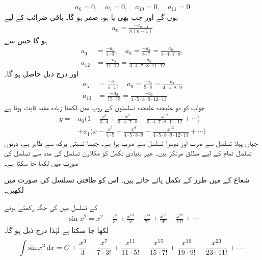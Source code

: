 \begin{align*}
a_6=0,\quad a_7=0,\quad a_{10}=0,\quad a_{11}=0
\end{align*}
ہوں گے اور جب بھی  یا  ہو،  صفر ہو گا۔ باقی ضرائب کے لیے 
\begin{align*}
a_n=\frac{-a_{n-4}}{n(n-1)}
\end{align*}
ہو گا جس سے
\begin{align*}
a_4&=\frac{-a_0}{4\cdot 3},\quad a_8=\frac{-a_4}{8\cdot 7}=\frac{a_0}{3\cdot 4\cdot 7\cdot 8},\\
a_{12}&=\frac{-a_8}{11\cdot 12}=\frac{-a_0}{3\cdot 4\cdot 7\cdot 8\cdot 11\cdot 12}
\end{align*}
اور درج ذیل حاصل ہو گا۔
\begin{align*}
a_5&=\frac{-a_1}{5\cdot 4},\quad a_9=\frac{-a_5}{9\cdot 8}=\frac{a_1}{4\cdot 5\cdot 8\cdot 9}\\
a_{13}&=\frac{-a_9}{12\cdot 13}=\frac{-a_1}{4\cdot 5\cdot 8\cdot 9\cdot 12\cdot 13}
\end{align*}
جواب کو دو علیحدہ  علیحدہ تسلسلوں کے  روپ میں لکھنا زیادہ مفید ثابت ہوتا ہے
\begin{align*}
y=&a_0\big(1-\frac{x^4}{3\cdot 4}+\frac{x^8}{3\cdot 4\cdot 7\cdot 8}-\frac{x^{12}}{3\cdot4\cdot 7\cdot 8\cdot 11\cdot 12}+\cdots\big)\\
&+a_1\big(x-\frac{x^5}{4\cdot 5}+\frac{x^9}{4\cdot 5\cdot 8\cdot 9}-\frac{x^{13}}{4\cdot 5\cdot 8\cdot 9\cdot 12\cdot 13}+\cdots\big)
\end{align*}
جہاں  پہلا تسلسل  سے ضرب اور دوسرا تسلسل  سے ضرب ہوا ہے۔ جیسا نسبتی پرکھ سے ظاہر ہے، دونوں تسلسل تمام  کے لیے مطلق مرتکز ہیں۔
غیر بنیادی تکمل کو مکلارن تسلسل کی مدد سے تسلسل کی صورت میں لکھا جا سکتا ہے۔

شعاع   کے میں  طرز کے تکمل پائے جاتے ہیں۔ اس کو طاقتی تسلسل کی صورت میں لکھیں۔

 کے تسلسل میں  کی جگہ  رکھتے  ہوئے
\begin{align*}
\sin x^2=x^2-\frac{x^6}{3!}+\frac{x^{10}}{5!}-\frac{x^{14}}{7!}+\frac{x^{18}}{9!}-\frac{x^{22}}{11!}+\cdots
\end{align*}
لکھا جا سکتا ہے لہٰذا درج ذیل ہو گا۔
\begin{align*}
\int \sin x^2\dif x=C+\frac{x^3}{3}-\frac{x^7}{7\cdot 3!}+\frac{x^{11}}{11\cdot 5!}-\frac{x^{15}}{15\cdot 7!}+\frac{x^{19}}{19\cdot 9!}-\frac{x^{23}}{23\cdot 11!}+\cdots
\end{align*}

